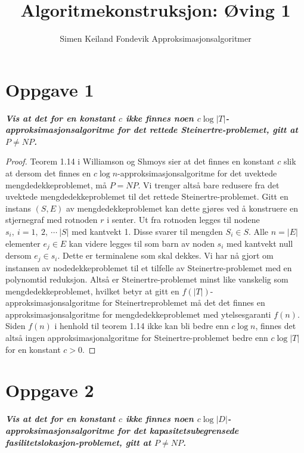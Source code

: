 \documentclass[12pt]{article}
\begin{document}
 
\title{Algoritmekonstruksjon: Øving 1}
\author{Simen Keiland Fondevik
Approksimasjonsalgoritmer}

\maketitle

\section{Oppgave 1}
\it{\textbf{Vis at det for en konstant $c$ ikke finnes noen $c \log |T|$-approksimasjonsalgoritme for det rettede Steinertre-problemet, gitt at $P \neq NP$.}}

\begin{proof}
Teorem 1.14 i Williamson og Shmoys sier at det finnes en konstant $c$ slik at dersom det finnes en $c \log n$-approksimasjonsalgoritme for det uvektede mengdedekkeproblemet, må $P=NP$. Vi trenger altså bare redusere fra det uvektede mengdedekkeproblemet til det rettede Steinertre-problemet. Gitt en instans $(S, E)$ av mengdedekkeproblemet kan dette gjøres ved å konstruere en stjernegraf med rotnoden $r$ i senter. Ut fra rotnoden legges til nodene $s_i,~i = 1, ~2, ~\cdots ~|S|$ med kantvekt 1. Disse svarer til mengden $S_i \in S$. Alle $n = |E|$ elementer $e_j \in E$ kan videre legges til som barn av noden $s_i$ med kantvekt null dersom $e_j \in s_i$. Dette er terminalene som skal dekkes. Vi har nå gjort om instansen av nodedekkeproblemet til et tilfelle av Steinertre-problemet med en polynomtid reduksjon. Altså er Steinertre-problemet minst like vanskelig som mengdedekkeproblemet, hvilket betyr at gitt en $f(|T|)$-approksimasjonsalgoritme for Steinertreproblemet må det det finnes en approksimasjonsalgoritme for mengdedekkeproblemet med ytelsesgaranti $f(n)$. Siden $f(n)$ i henhold til teorem 1.14 ikke kan bli bedre enn $c \log n$, finnes det altså ingen approksimasjonalgoritme for Steinertre-problemet bedre enn $c \log |T|$ for en konstant $c>0$.
\end{proof}

\section{Oppgave 2}
\it{\textbf{Vis at det for en konstant $c$ ikke finnes noen $c \log |D|$-approksimasjonsalgoritme for det kapasitetsubegrensede fasilitetslokasjon-problemet, gitt at $P \neq NP$.}}
\end{document}
